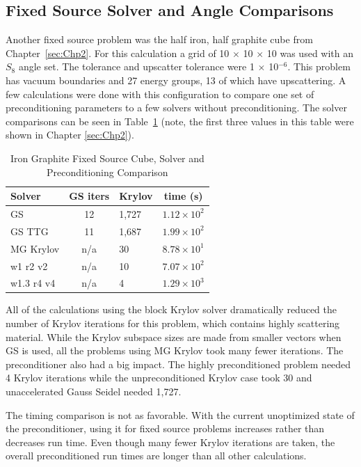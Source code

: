 \subsection{Fixed Source Solver and Angle Comparisons} 
Another fixed source problem was the half iron, half graphite cube from Chapter~\ref{sec:Chp2}. For this calculation a grid of 10 $\times$ 10 $\times$ 10 was used with an $S_{8}$ angle set. The tolerance and upscatter tolerance were 1 $\times$ 10$^{-6}$. This problem has vacuum boundaries and 27 energy groups, 13 of which have upscattering. A few calculations were done with this configuration to compare one set of preconditioning parameters to a few solvers without preconditioning. The solver comparisons can be seen in Table~\ref{table:FeC solvers} (note, the first three values in this table were shown in Chapter \ref{sec:Chp2}). 
%
\begin{table}[!h]
\caption{Iron Graphite Fixed Source Cube, Solver and Preconditioning Comparison}
\begin{center}
\begin{tabular}{| l | c | l | c |}
\hline
Solver & GS iters & Krylov & time (s)\\[0.5ex]
\hline
GS &  12 & 1,727 & $1.12 \times 10^{2}$ \\
GS TTG & 11 & 1,687 & $1.99 \times 10^{2}$  \\
MG Krylov & n/a & 30 & $8.78 \times 10^{1}$ \\
w1 r2 v2 & n/a & 10 & $7.07 \times 10^{2}$ \\
w1.3 r4 v4 & n/a & 4 & $1.29 \times 10^{3}$ \\
\hline
\end{tabular}
\end{center}
\label{table:FeC solvers}
\end{table}

All of the calculations using the block Krylov solver dramatically reduced the number of Krylov iterations for this problem, which contains highly scattering material. While the Krylov subspace sizes are made from smaller vectors when GS is used, all the problems using MG Krylov took many fewer iterations. The preconditioner also had a big impact. The highly preconditioned problem needed 4 Krylov iterations while the unpreconditioned Krylov case took 30 and unaccelerated Gauss Seidel needed 1,727.  

The timing comparison is not as favorable. With the current unoptimized state of the preconditioner, using it for fixed source problems increases rather than decreases run time. Even though many fewer Krylov iterations are taken, the overall preconditioned run times are longer than all other calculations. 

